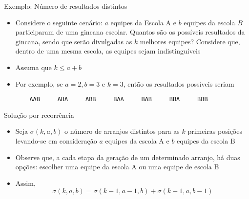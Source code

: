 \begin{frame}[fragile]{Exemplo: Número de resultados distintos}

    \begin{itemize}
        \item Considere o seguinte cenário: $a$ equipes da Escola A e $b$ equipes da escola $B$
            participaram de uma gincana escolar. Quantos são os possíveis resultados da gincana,
            sendo que serão divulgadas as $k$ melhores equipes? Considere que, dentro de uma mesma
            escola, as equipes sejam indistinguíveis

        \item Assuma que $k \leq a + b$

        \item Por exemplo, se $a = 2, b = 3$ e $k = 3$, então os resultados possíveis seriam
\begin{verbatim}
    AAB     ABA     ABB     BAA     BAB     BBA     BBB
\end{verbatim}

    \end{itemize}

\end{frame}

\begin{frame}[fragile]{Solução por recorrência}

    \begin{itemize}
        \item Seja $\sigma(k, a, b)$ o número de arranjos distintos para as $k$ primeiras posições
            levando-se em consideração $a$ equipes da escola A e $b$ equipes da escola B

        \item Observe que, a cada etapa da geração de um determinado arranjo, há duas opções:
            escolher uma equipe da escola A ou uma equipe de escola B

        \item  Assim,
$$
    \sigma(k, a, b) = \sigma(k - 1, a - 1, b) + \sigma(k - 1, a, b - 1)
$$
    \end{itemize}

\end{frame}

